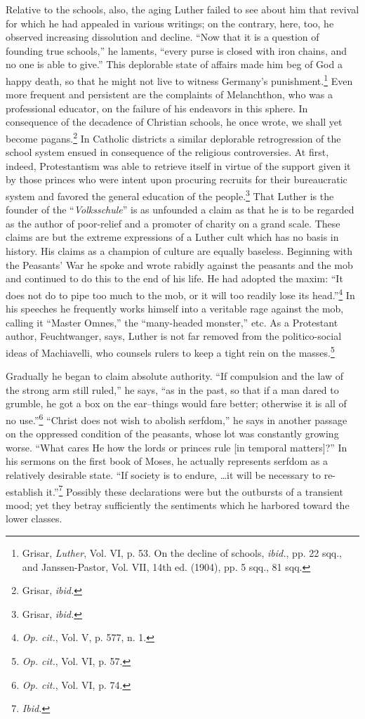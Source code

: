 Relative to the schools, also, the aging Luther failed to see about
him that revival for which he had appealed in various writings; on
the contrary, here, too, he observed increasing dissolution and decline.
“Now that it is a question of founding true schools,” he laments,
“every purse is closed with iron chains, and no one is able to give.”
This deplorable state of affairs made him beg of God a happy death,
so that he might not live to witness Germany’s punishment.\footnote
{Grisar, \textit{Luther}, Vol. VI, p. 53. On the decline of schools, \textit{ibid.}, pp. 22 sqq., and
Janssen-Pastor, Vol. VII, 14th ed. (1904), pp. 5 sqq., 81 sqq.}
Even more frequent and persistent are the complaints of Melanchthon, who
was a professional educator, on the failure of his endeavors in this
sphere. In consequence of the decadence of Christian schools, he once
wrote, we shall yet become pagans.\footnote{Grisar, \textit{ibid.}}
In Catholic districts a similar
deplorable retrogression of the school system ensued in consequence
of the religious controversies. At first, indeed, Protestantism was able
to retrieve itself in virtue of the support given it by those princes
who were intent upon procuring recruits for their bureaucratic system
and favored the general education of the people.\footnote{Grisar, \textit{ibid.}}
That Luther
is the founder of the “\textit{Volksschule}” is as unfounded a claim as that
he is to be regarded as the author of poor-relief and a promoter of
charity on a grand scale. These claims are but the extreme expressions
of a Luther cult which has no basis in history. His claims as a champion
of culture are equally baseless. Beginning with the Peasants’
War he spoke and wrote rabidly against the peasants and the mob
and continued to do this to the end of his life. He had adopted the
maxim: “It does not do to pipe too much to the mob, or it will too
readily lose its head.”\footnote{\textit{Op. cit.}, Vol. V, p. 577, n. 1.}
 In his speeches he frequently works himself
into a veritable rage against the mob, calling it “Master Omnes,”
the “many-headed monster,” etc. As a Protestant author, Feuchtwanger,
says, Luther is not far removed from the politico-social ideas
of Machiavelli, who counsels rulers to keep a tight rein on the masses.\footnote{\textit{Op. cit.}, Vol. VI, p. 57.}

Gradually he began to claim absolute authority. “If compulsion and
the law of the strong arm still ruled,” he says, “as in the past, so that
if a man dared to grumble, he got a box on the ear--things would
fare better; otherwise it is all of no use.”\footnote{\textit{Op. cit.}, Vol. VI, p. 74.}
“Christ does not wish to
abolish serfdom,” he says in another passage on the oppressed condition
of the peasants, whose lot was constantly growing worse. “What cares
He how the lords or princes rule [in temporal matters]?” In his sermons
on the first book of Moses, he actually represents serfdom as a
relatively desirable state. “If society is to endure, \dots it will be
necessary to re-establish it.”\footnote{\textit{Ibid.}}
Possibly these declarations were but
the outbursts of a transient mood; yet they betray sufficiently the
sentiments which he harbored toward the lower classes.

